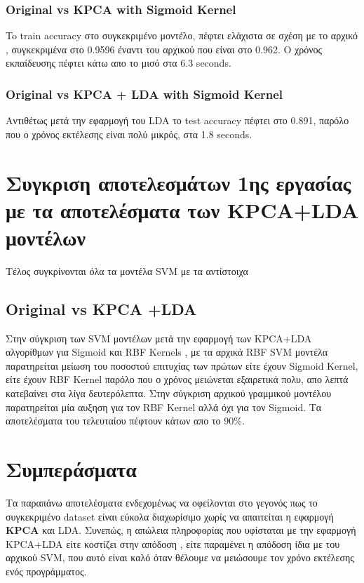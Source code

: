 \subsubsection{Original vs KPCA with Sigmoid Kernel}
To train accuracy στο συγκεκριμένο μοντέλο, πέφτει ελάχιστα σε σχέση με το αρχικό , συγκεκριμένα στο 0.9596 έναντι του αρχικού που είναι στο 0.962. Ο χρόνος εκπαίδευσης πέφτει κάτω απο το μισό στα 6.3 seconds.

\subsubsection{Original vs KPCA + LDA with Sigmoid Kernel}
Αντιθέτως μετά την εφαρμογή του LDA το test accuracy πέφτει στο 0.891, παρόλο που ο χρόνος εκτέλεσης είναι πολύ μικρός, στα 1.8 seconds.

\section{Συγκριση αποτελεσμάτων 1ης εργασίας με τα αποτελέσματα των KPCA+LDA μοντέλων}
Τέλος συγκρίνονται όλα τα μοντέλα SVM με τα αντίστοιχα 
\subsection{Original vs KPCA +LDA}
Στην σύγκριση των SVM μοντέλων μετά την εφαρμογή των KPCA+LDA αλγορίθμων για Sigmoid και RBF Kernels , με τα αρχικά RBF SVM μοντέλα παρατηρείται μείωση του ποσοστού επιτυχίας των πρώτων είτε έχουν Sigmoid Kernel, είτε έχουν RBF Kernel παρόλο που ο χρόνος μειώνεται εξαιρετικά πολυ, απο λεπτά κατεβαίνει στα λίγα δευτερόλεπτα. Στην σύγκριση αρχικού γραμμικού μοντέλου	 παρατηρείται μία αυξηση για τον RBF Kernel αλλά όχι για τον Sigmoid. Τα αποτελέσματα του τελευταίου πέφτουν κάτων απο το 90\%.
\section{Συμπεράσματα}
Τα παραπάνω αποτελέσματα ενδεχομένως να οφείλονται στο γεγονός πως το συγκεκριμένο dataset είναι εύκολα διαχωρίσιμο χωρίς να απαιτείται η εφαρμογή \textbf{KPCA} και LDA. Συνεπώς, η απώλεια πληροφορίας που υφίσταται με την εφαρμογή KPCA+LDA είτε κοστίζει στην απόδοση , είτε παραμένει η απόδοση ίδια με του αρχικού SVM, που αυτό είναι καλό όταν θέλουμε να μειώσουμε τον χρόνο εκτέλεσης ενός προγράμματος.

